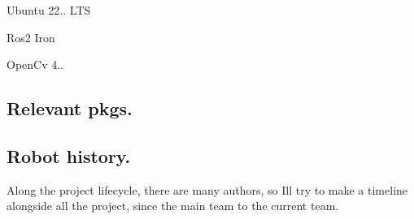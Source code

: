 \begin{DoxyItemize}
\item Ubuntu 22.. L\+TS
\item Ros2 Iron
\item Open\+Cv 4..
\end{DoxyItemize}

\subsection*{Relevant pkgs.}

\subsection*{Robot history.}

Along the project lifecycle, there are many authors, so I\textquotesingle{}ll try to make a timeline alongside all the project, since the main team to the current team. ~\newline

